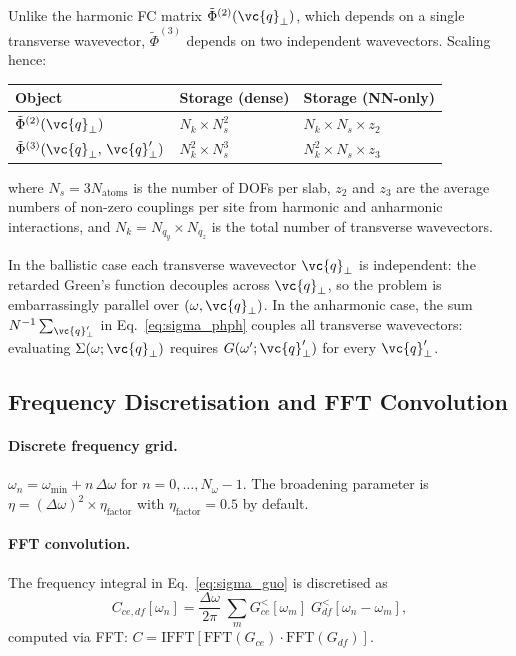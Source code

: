 Unlike the harmonic FC matrix $\tilde{\Phi}^{(2)}(\vc{q}_\perp)$, which
depends on a single transverse wavevector, $\tilde{\Phi}^{(3)}$ depends
on two independent wavevectors.  Scaling hence:
\begin{center}
\begin{tabular}{lll}
  \toprule
  Object & Storage (dense) & Storage (NN-only) \\
  \midrule
  $\tilde{\Phi}^{(2)}(\vc{q}_\perp)$ &
    $N_k \times N_s^2$ &
    $N_k \times N_s \times z_2$ \\
  $\tilde{\Phi}^{(3)}(\vc{q}_\perp,\,\vc{q}'_\perp)$ &
    $N_k^2 \times N_s^3$ &
    $N_k^2 \times N_s \times z_3$ \\
  \bottomrule
\end{tabular}
\end{center}
where $N_s = 3N_\mathrm{atoms}$ is the number of DOFs per slab,
$z_2$ and $z_3$ are the average numbers of non-zero couplings per
site from harmonic and anharmonic interactions, and
$N_k = N_{q_y}\times N_{q_z}$ is the total number of transverse
wavevectors.

In the ballistic case each transverse wavevector $\vc{q}_\perp$ is
independent: the retarded Green's function decouples across
$\vc{q}_\perp$, so the problem is embarrassingly parallel over
$(\omega, \vc{q}_\perp)$.  In the anharmonic case, the sum
$N^{-1}\sum_{\vc{q}'_\perp}$ in Eq.~\eqref{eq:sigma_phph} couples
all transverse wavevectors: evaluating
$\Sigma(\omega; \vc{q}_\perp)$ requires
$G(\omega'; \vc{q}'_\perp)$ for every $\vc{q}'_\perp$.

\subsection{Frequency Discretisation and FFT Convolution}
\label{sec:fft}

\paragraph{Discrete frequency grid.}
$\omega_n = \omega_\mathrm{min} + n\,\Delta\omega$ for
$n = 0,\ldots,N_\omega-1$.  The broadening parameter is
$\eta = (\Delta\omega)^2 \times \eta_\mathrm{factor}$ with
$\eta_\mathrm{factor} = 0.5$ by default.

\paragraph{FFT convolution.}
The frequency integral in Eq.~\eqref{eq:sigma_guo} is discretised as
\begin{equation}
  C_{ce,df}[\omega_n]
  = \frac{\Delta\omega}{2\pi}\;
    \sum_{m} G^<_{ce}[\omega_m]\;G^<_{df}[\omega_n - \omega_m],
\end{equation}
computed via FFT: $C = \mathrm{IFFT}[\mathrm{FFT}(G_{ce})\cdot\mathrm{FFT}(G_{df})]$.

